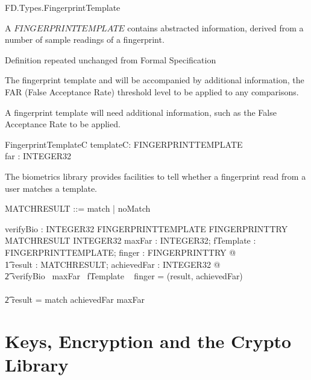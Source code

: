 \begin{traceunit}{FD.Types.FingerprintTemplate}
\end{traceunit}


A $FINGERPRINTTEMPLATE$ contains abstracted information, derived from
a number of sample readings of a fingerprint.

\begin{zed}
	[ FINGERPRINTTEMPLATE ]
\end{zed}
\begin{Zcomment}
\item Definition repeated unchanged from Formal Specification \cite{FS}
\end{Zcomment}

The fingerprint template and will be accompanied by additional information,
the FAR (False Acceptance Rate) threshold level to be applied to any comparisons.

A fingerprint template will need additional information,
such as the False Acceptance Rate to be applied.
\begin{schema}{FingerprintTemplateC}
	templateC: FINGERPRINTTEMPLATE
\\      far : INTEGER32
\end{schema}

The biometrics library provides facilities to tell whether a
fingerprint read from a user matches a template.

\begin{zed}
        MATCHRESULT ::= match | noMatch
\end{zed}


\begin{axdef}
        verifyBio : INTEGER32 \fun FINGERPRINTTEMPLATE \fun FINGERPRINTTRY \fun
        MATCHRESULT \cross INTEGER32
\where
        \forall maxFar : INTEGER32;
                fTemplate : FINGERPRINTTEMPLATE; 
                finger : FINGERPRINTTRY  @ 
\\ \t1  \exists result :  MATCHRESULT; achievedFar : INTEGER32 @
\\      \t2 verifyBio~ maxFar~ fTemplate ~ finger = (result, achievedFar) \\
\\      \t2 \land result = match \implies achievedFar \leq maxFar   
\end{axdef}

\section{Keys, Encryption and the Crypto Library}

